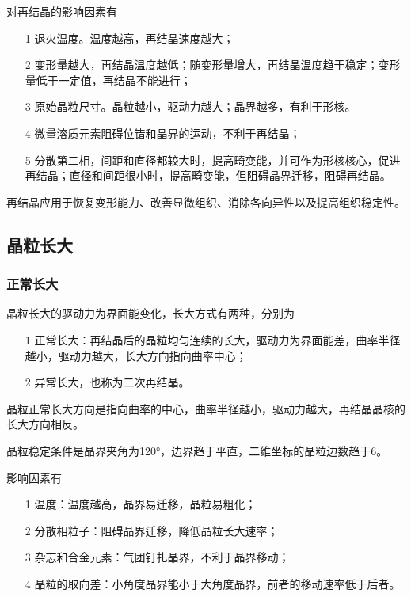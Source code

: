             对再结晶的影响因素有
            \begin{itemize}
                \item[1] 退火温度。温度越高，再结晶速度越大；
                \item[2] 变形量越大，再结晶温度越低；随变形量增大，再结晶温度趋于稳定；变形量低于一定值，再结晶不能进行；
                \item[3] 原始晶粒尺寸。晶粒越小，驱动力越大；晶界越多，有利于形核。
                \item[4] 微量溶质元素阻碍位错和晶界的运动，不利于再结晶；
                \item[5] 分散第二相，间距和直径都较大时，提高畸变能，并可作为形核核心，促进再结晶；直径和间距很小时，提高畸变能，但阻碍晶界迁移，阻碍再结晶。
            \end{itemize}

            再结晶应用于恢复变形能力、改善显微组织、消除各向异性以及提高组织稳定性。
        \subsection{晶粒长大}
            \subsubsection{正常长大}
            晶粒长大的驱动力为界面能变化，长大方式有两种，分别为
            \begin{itemize}
                \item[1] 正常长大：再结晶后的晶粒均匀连续的长大，驱动力为界面能差，曲率半径越小，驱动力越大，长大方向指向曲率中心；
                \item[2] 异常长大，也称为二次再结晶。
            \end{itemize}

            晶粒正常长大方向是指向曲率的中心，曲率半径越小，驱动力越大，再结晶晶核的长大方向相反。

            晶粒稳定条件是晶界夹角为\ang{120}，边界趋于平直，二维坐标的晶粒边数趋于6。

            影响因素有
            \begin{itemize}
                \item[1] 温度：温度越高，晶界易迁移，晶粒易粗化；
                \item[2] 分散相粒子：阻碍晶界迁移，降低晶粒长大速率；
                \item[3] 杂志和合金元素：气团钉扎晶界，不利于晶界移动；
                \item[4] 晶粒的取向差：小角度晶界能小于大角度晶界，前者的移动速率低于后者。
            \end{itemize}

